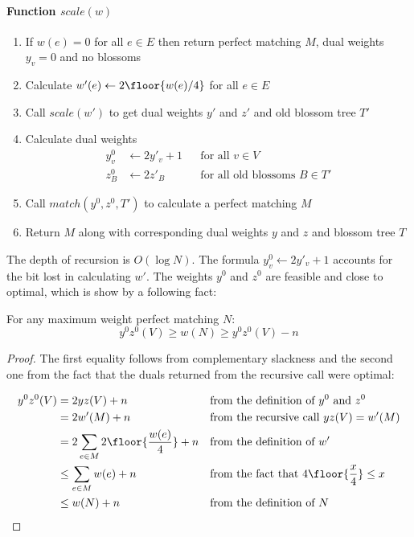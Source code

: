\paragraph*{Function $scale(w)$}
\begin{enumerate}
    \item If $w(e) = 0$ for all $e \in E$ then return perfect matching $M$, dual weights $y_v = 0$ and no blossoms
    \item Calculate $w'(e) \gets 2\floor{ w(e)/4 }$ for all $e \in E$
    \item Call $scale(w')$ to get dual weights $y'$ and $z'$ and old blossom tree $T'$
    \item Calculate dual weights
    \begin{align*}
        y^0_v &\gets 2y'_v + 1 && \text{for all $v \in V$} \\
        z^0_B &\gets 2z'_B && \text{for all old blossoms $B \in T'$}
    \end{align*}
    \item Call $match(y^0, z^0, T')$ to calculate a perfect matching $M$
    \item Return $M$ along with corresponding dual weights $y$ and $z$ and blossom tree $T$
\end{enumerate}

The depth of recursion is $O(\log N)$. The formula $y^0_v \gets 2y'_v + 1$ accounts for the bit lost in calculating $w'$. The weights $y^0$ and $z^0$ are feasible and close to optimal, which is show by a following fact:

\begin{theorem}
    For any maximum weight perfect matching $N$:
    \begin{equation}\label{eq:3}
        y^0z^0(V) \geq w(N) \geq y^0z^0(V) - n
    \end{equation}    
\end{theorem}

\begin{proof}
    The first equality follows from complementary slackness and the second one from the fact that the duals returned from the recursive call were optimal:

    \begin{align*}
        y^0z^0(V) &= 2yz(V) + n && \text{from the definition of $y^0$ and $z^0$}\\
        &= 2w'(M) + n && \text{from the recursive call $yz(V) = w'(M)$} \\
        &= 2 \sum_{e \in M} 2 \floor{\frac{w(e)}{4}} + n && \text{from the definition of $w'$} \\
        &\leq \sum_{e \in M} w(e) + n && \text{from the fact that $4\floor{\frac{x}{4}} \leq x$} \\
        &\leq w(N) + n  && \text{from the definition of $N$} \\
    \end{align*}    
\end{proof}

